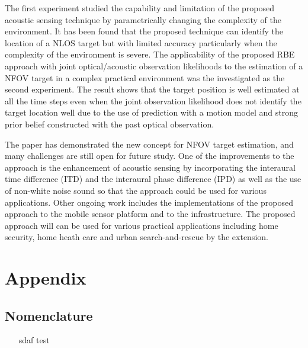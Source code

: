 The first experiment studied the capability and limitation of the proposed acoustic sensing technique by parametrically changing the complexity of the environment.  It has been found that the proposed technique can identify the location of a NLOS target but with limited accuracy particularly when the complexity of the environment is severe.  The applicability of the proposed RBE approach with joint optical/acoustic observation likelihoods to the estimation of a NFOV target in a complex practical environment was the investigated as the second experiment.  The result shows that the target position is well estimated at all the time steps even when the joint observation likelihood does not identify the target location well due to the use of prediction with a motion model and strong prior belief constructed with the past optical observation.  

The paper has demonstrated the new concept for NFOV target estimation, and many challenges are still open for future study.  One of the improvements to the approach is the enhancement of acoustic sensing by incorporating the interaural time difference (ITD) and the interaural phase difference (IPD) as well as the use of non-white noise sound so that the approach could be used for various applications.  Other ongoing work includes the implementations of the proposed approach to the mobile sensor platform and to the infrastructure.  The proposed approach will can be used for various practical applications including home security, home heath care and urban search-and-rescue by the extension.  



\appendix
\section*{Appendix}
\subsection*{Nomenclature}
\printnomenclature
\begin{itemize}
\item [sdaf] test
\end{itemize}

